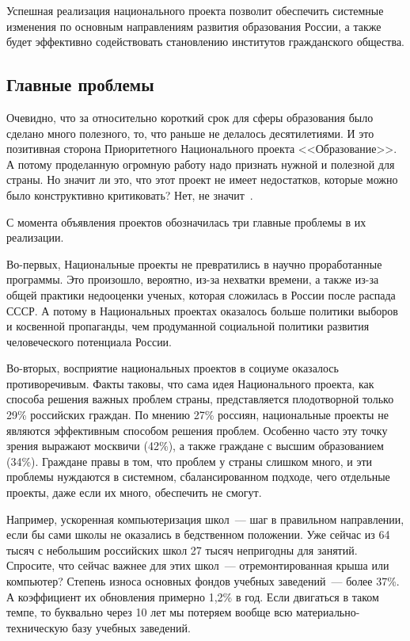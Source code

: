 \documentclass[article, 12pt, russian, oneside]{ncc}
\begin{document}
Успешная реализация национального проекта позволит обеспечить
системные изменения по основным направлениям развития образования
России, а также будет эффективно содействовать становлению институтов
гражданского общества.

\subsection{Главные проблемы}

Очевидно, что за относительно короткий срок для сферы образования было
сделано много полезного, то, что раньше не делалось десятилетиями. И
это позитивная сторона Приоритетного Национального проекта
<<Образование>>. А потому проделанную огромную работу надо признать
нужной и полезной для страны. Но значит ли это, что этот проект не
имеет недостатков, которые можно было конструктивно критиковать? Нет,
не значит~\cite{Edu_Result}.

С момента объявления проектов обозначилась три главные проблемы в их
реализации.

Во-первых, Национальные проекты не превратились в научно проработанные
программы. Это произошло, вероятно, из-за нехватки времени, а также
из-за общей практики недооценки ученых, которая сложилась в России
после распада СССР. А потому в Национальных проектах оказалось больше
политики выборов и косвенной пропаганды, чем продуманной социальной
политики развития человеческого потенциала России.

Во-вторых, восприятие национальных проектов в социуме оказалось
противоречивым. Факты таковы, что сама идея Национального проекта, как
способа решения важных проблем страны, представляется плодотворной
только 29\% российских граждан. По мнению 27\% россиян, национальные
проекты не являются эффективным способом решения проблем. Особенно
часто эту точку зрения выражают москвичи (42\%), а также граждане с
высшим образованием (34\%). Граждане правы в том, что проблем у страны
слишком много, и эти проблемы нуждаются в системном, сбалансированном
подходе, чего отдельные проекты, даже если их много, обеспечить не
смогут.

Например, ускоренная компьютеризация школ~--- шаг в правильном
направлении, если бы сами школы не оказались в бедственном
положении. Уже сейчас из 64 тысяч с небольшим российских школ 27 тысяч
непригодны для занятий. Спросите, что сейчас важнее для этих школ~---
отремонтированная крыша или компьютер? Степень износа основных фондов
учебных заведений~--- более 37\%. А коэффициент их обновления примерно
1,2\% в год. Если двигаться в таком темпе, то буквально через 10 лет
мы потеряем вообще всю материально-техническую базу учебных заведений.
\end{document}
